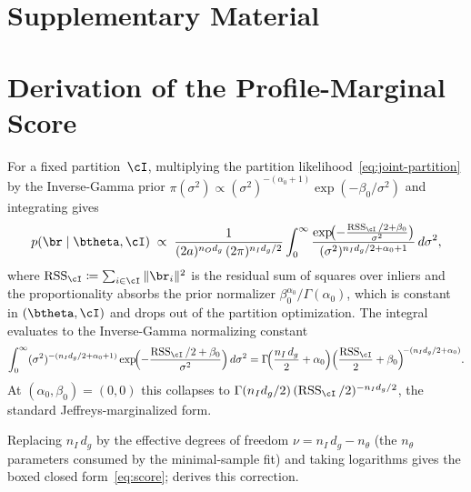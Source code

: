 \documentclass{article}
\DeclareMathOperator{\RSS}{RSS}
\newcommand{\invgamma}{Inverse-Gamma\xspace}
\begin{document}
\newpage
\appendix
\setcounter{section}{0}
\renewcommand{\thesection}{\Alph{section}}

\section*{Supplementary Material}

\section{Derivation of the Profile-Marginal Score}
\label{sec:supp-score-deriv}

For a fixed partition~$\cI$, multiplying the partition
likelihood~\eqref{eq:joint-partition} by the \invgamma prior
$\pi(\sigma^2) \propto (\sigma^2)^{-(\alpha_0+1)}\exp(-\beta_0/\sigma^2)$
and integrating gives
\begin{equation}
	p(\br \mid \btheta, \cI)
	\;\propto\;
	\frac{1}{(2a)^{n_O d_g}\,(2\pi)^{n_I d_g/2}}
	\int_0^\infty
	\frac{
		\exp\!\bigl({-}\tfrac{\RSS_\cI/2 + \beta_0}{\sigma^2}\bigr)
	}{
		(\sigma^2)^{n_I d_g/2 + \alpha_0 + 1}
	}\,
	d\sigma^2,
	\label{eq:marg-sigma}
\end{equation}
where $\RSS_\cI \coloneqq \sum_{i \in \cI}\|\br_i\|^2$
is the residual sum of squares over inliers and the
proportionality absorbs the prior normalizer
$\beta_0^{\alpha_0}/\Gamma(\alpha_0)$, which is constant in
$(\btheta, \cI)$ and drops out of the partition optimization.
The integral evaluates to the \invgamma normalizing
constant
\begin{equation}
	\int_0^\infty
	(\sigma^2)^{-(n_I d_g/2 + \alpha_0 + 1)}
	\exp\!\Bigl({-}\frac{\RSS_\cI/2 + \beta_0}{\sigma^2}\Bigr)\,
	d\sigma^2
	= \Gamma\!\Bigl(\frac{n_I\,d_g}{2} + \alpha_0\Bigr)
	\Bigl(\frac{\RSS_\cI}{2} + \beta_0\Bigr)^{\!-(n_I d_g/2 + \alpha_0)}.
	\label{eq:invgamma-integral}
\end{equation}
At $(\alpha_0,\beta_0) = (0,0)$ this collapses to
$\Gamma(n_I d_g/2)\,(\RSS_\cI/2)^{-n_I d_g/2}$, the standard
Jeffreys-marginalized form.

Replacing $n_I\,d_g$ by the effective degrees of freedom
$\nu = n_I\,d_g - n_\theta$ (the $n_\theta$ parameters consumed by
the minimal-sample fit) and taking logarithms gives the boxed
closed form~\eqref{eq:score}; 
derives this correction.
\end{document}
